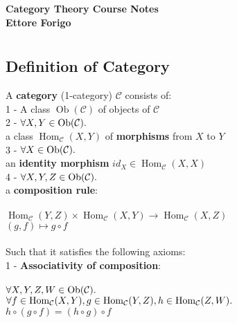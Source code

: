 \documentclass[a4paper, twoside, english, 11pt]{book}
\DeclareMathOperator{\Hom}{Hom}
\DeclareMathOperator{\Ob}{Ob}
\newcommand{\C}{\mathcal C}
\begin{document}
\pagestyle{headings}

\frontmatter

\begin{titlepage}
	\begin{center}
		{\huge \bfseries Category Theory Course Notes \\}
		\vspace{1.5cm}
		{\Large \bfseries Ettore Forigo}
	\end{center}
\end{titlepage}

\mainmatter

\chapter{}



\section{Definition of Category}

A \textbf{category} (1-category) $\C$ consists of: \\

1 - A class $\Ob(\C)$ of objects of $\C$ \\

2 - $\forall X, Y \in \Ob(\C) \ldotp$ \\
\indent\indent
a class $\Hom_\C(X, Y)$ of \textbf{morphisms} from $X$ to $Y$ \\

3 - $\forall X \in \Ob(\C) \ldotp$ \\
\indent\indent
an \textbf{identity morphism} $id_X \in \Hom_\C(X, X)$ \\

4 - $\forall X, Y, Z \in \Ob(\C) \ldotp$ \\
\indent\indent
a \textbf{composition rule}: \\\\
\indent\indent\indent
$\Hom_\C(Y, Z) \times \Hom_\C(X, Y) \rightarrow \Hom_\C(X, Z)$ \\
\indent\indent\indent
$(g, f) \mapsto g \circ f$ \\\\

\noindent
Such that it satisfies the following axioms: \\

1 - \textbf{Associativity of composition}: \\\\
\indent\indent
$\forall X, Y, Z, W \in \Ob(\C) \ldotp$ \\
\indent\indent
$\forall f \in \Hom_\C(X, Y), g \in \Hom_\C(Y, Z), h \in \Hom_\C(Z, W) \ldotp$ \\
\indent\indent
$h \circ (g \circ f) = (h \circ g) \circ f$ \\
\end{document}
